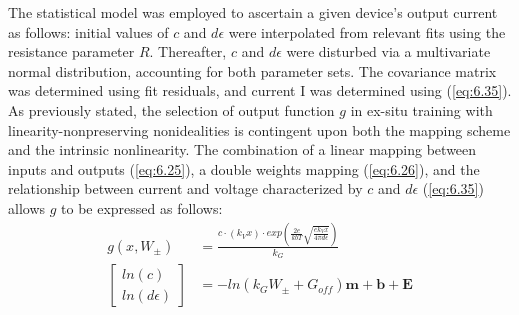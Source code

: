 
\noindent The statistical model was employed to ascertain a given device's output current as follows: initial values of $c$ and $d\epsilon$ were interpolated from relevant fits using the resistance parameter $R$. Thereafter, $c$ and $d\epsilon$ were disturbed via a multivariate normal distribution, accounting for both parameter sets. The covariance matrix was determined using fit residuals, and current I was determined using (\ref{eq:6.35}).\\


\noindent As previously stated, the selection of output function $g$ in ex-situ training with linearity-nonpreserving nonidealities is contingent upon both the mapping scheme and the intrinsic nonlinearity. The combination of a linear mapping between inputs and outputs (\ref{eq:6.25}), a double weights mapping (\ref{eq:6.26}), and the relationship between current and voltage characterized by $c$ and $d\epsilon$ (\ref{eq:6.35}) allows $g$ to be expressed as follows:
\begin{align}
g\left( x, W_\pm \right) &= \frac{c\cdot (k_V x) \cdot exp\left( \frac{2e}{kbT} \sqrt{\frac{ek_Vx}{4\pi d\epsilon}} \right)}{k_G} \label{eq:6.39} \\
\begin{bmatrix} ln(c) \\ ln(d\epsilon) \end{bmatrix} &= -ln\left( k_GW_\pm + G_{off} \right)\textbf{m} + \textbf{b} + \textbf{E} \label{eq:6.40}
\end{align}

